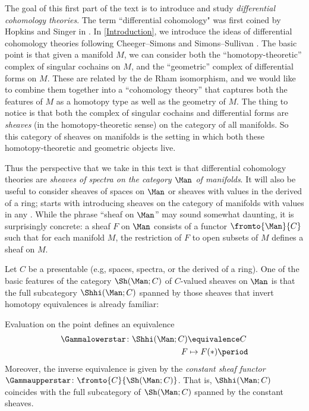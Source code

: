 \label{part:basics}

The goal of this first part of the text is to introduce and study \textit{differential cohomology theories}. 
The term ``differential cohomology" was first coined by Hopkins and Singer in \cite{HopkinsSinger}. 
In \cref{Introduction}, we introduce the ideas of differential cohomology theories following Cheeger--Simons \cite{MR827262} and Simons--Sullivan \cite{MR2365651}.
The basic point is that given a manifold $ M $, we can consider both the ``homotopy-theoretic'' complex of singular
cochains on $ M $, and the ``geometric'' complex of differential forms on $ M $.  These are related by the de Rham
isomorphism, and we would like to combine them together into a ``cohomology theory'' that captures both the
features of $ M $ as a homotopy type as well as the geometry of $ M $.  The thing to notice is that both the complex
of singular cochains and differential forms are \textit{sheaves} (in the homotopy-theoretic sense) on the category
of all manifolds.  So this category of sheaves on manifolds is the setting in which both these homotopy-theoretic
and geometric objects live.

Thus the perspective that we take in this text is that differential cohomology theories are \textit{sheaves of spectra on the category $ \Man $ of manifolds}.
It will also be useful to consider sheaves of spaces on $ \Man $ or sheaves with values in the derived \category of a ring;  starts with introducing sheaves on the category of manifolds with values in any \category.
While the phrase ``sheaf on $ \Man $'' may sound somewhat daunting, it is surprisingly concrete: a sheaf $ F $ on $ \Man $ consists of a functor $ \fromto{\Man}{C} $ such that for each manifold $ M $, the restriction of $ F $ to open subsets of $ M $ defines a sheaf on $ M $. 

Let $ C $ be a presentable \category (e.g, spaces, spectra, or the derived \category of a ring).
One of the basic features of the category $ \Sh(\Man;C) $ of $ C $-valued sheaves on $ \Man $ is that the full subcategory $ \Shhi(\Man;C) $ spanned by those sheaves that invert homotopy equivalences is already familiar: 

\begin{theorem}\label{introthm:Dugger}
	Evaluation on the point defines an equivalence
	\begin{align*}
		\Gammalowerstar \colon \Shhi(\Man;C) &\equivalence C \\
		F &\mapsto F(*) \period
	\end{align*}
	Moreover, the inverse equivalence is given by the \emph{constant sheaf functor} $ \Gammaupperstar \colon \fromto{C}{\Sh(\Man;C)} $.
	That is, $ \Shhi(\Man;C) $ coincides with the full subcategory of $ \Sh(\Man;C) $ spanned by the constant sheaves. 
\end{theorem}

